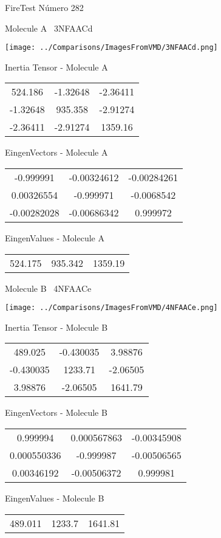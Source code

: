 \vtab[-3cm]
\begin{center}
{\large FireTest \tab Número 282}
\end{center}
\begin{multicols}{2}
\begin{center}

Molecule A \
3NFAACd

\texttt{[image: ../Comparisons/ImagesFromVMD/3NFAACd.png]}

Inertia Tensor - Molecule A \\
\begin{tabular}{|c c c|}
524.186	 & 	-1.32648	 & 	-2.36411	 \\
-1.32648	 & 	935.358	 & 	-2.91274	 \\
-2.36411	 & 	-2.91274	 & 	1359.16
\end{tabular}

\vtab
 EingenVectors - Molecule A     \\
\begin{tabular}{|c c c|}
-0.999991	 & 	-0.00324612	 & 	-0.00284261	 \\
0.00326554	 & 	-0.999971	 & 	-0.0068542	 \\
-0.00282028	 & 	-0.00686342	 & 	0.999972
\end{tabular}

\vtab
 EingenValues - Molecule A     \\
\begin{tabular}{|c c c|}
524.175	 & 	935.342	 & 	1359.19	 \\
\end{tabular}
\columnbreak

Molecule B \
4NFAACe

\texttt{[image: ../Comparisons/ImagesFromVMD/4NFAACe.png]}

Inertia Tensor - Molecule B \\
\begin{tabular}{|c c c|}
489.025	 & 	-0.430035	 & 	3.98876	 \\
-0.430035	 & 	1233.71	 & 	-2.06505	 \\
3.98876	 & 	-2.06505	 & 	1641.79
\end{tabular}

\vtab
 EingenVectors - Molecule B     \\
\begin{tabular}{|c c c|}
0.999994	 & 	0.000567863	 & 	-0.00345908	 \\
0.000550336	 & 	-0.999987	 & 	-0.00506565	 \\
0.00346192	 & 	-0.00506372	 & 	0.999981
\end{tabular}

\vtab
 EingenValues - Molecule B     \\
\begin{tabular}{|c c c|}
489.011	 & 	1233.7	 & 	1641.81	 \\
\end{tabular}

\end{center}
\end{multicols}

